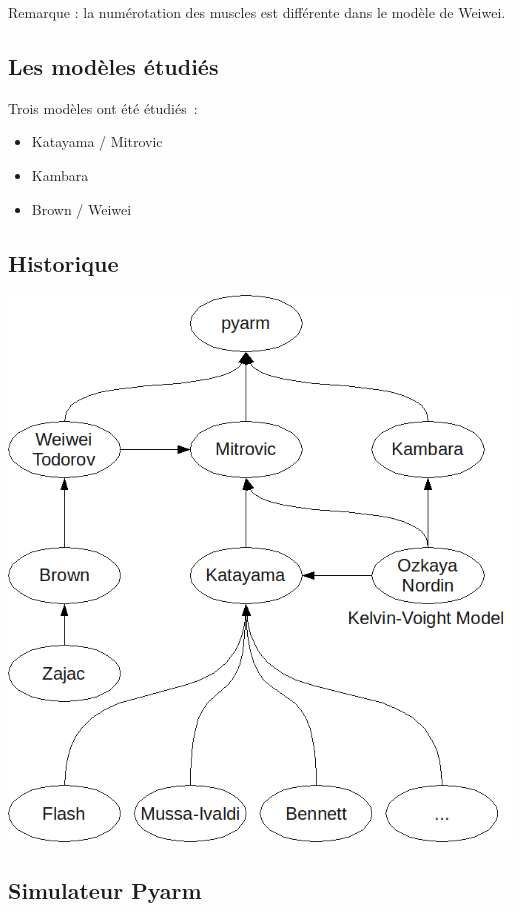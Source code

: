 \documentclass[pdftex,a4paper,11pt]{article}
\numberwithin{equation}{subsection}
\begin{document}
Remarque : la numérotation des muscles est différente dans le modèle de Weiwei.

\subsection{Les modèles étudiés}
Trois modèles ont été étudiés~:
\begin{itemize}
    \item Katayama / Mitrovic \cite{katayama1993, ozkaya1999, mitrovic10, mitrovic2008, mitrovic2009}
    \item Kambara \cite{kambara2009, ozkaya1999}
    \item Brown / Weiwei \cite{brown1999, li2006, li2004, todorov2005}
\end{itemize}


\subsection{Historique}

\begin{center}
        \includegraphics[width=.80\linewidth]{fig/bib}
\end{center}

\subsection{Simulateur Pyarm}
\end{document}
